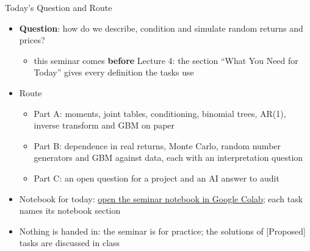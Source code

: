 \begin{frame}{Today's Question and Route}
\itemsize{\small}
\begin{itemize}
    \item \textbf{Question}: how do we describe, condition and simulate random returns and prices?
    \begin{itemize}
        \item this seminar comes \textbf{before} Lecture 4: the section ``What You Need for Today'' gives every definition the tasks use
    \end{itemize}
    \item Route
    \begin{itemize}
        \item Part A: moments, joint tables, conditioning, binomial trees, AR(1), inverse transform and GBM on paper
        \item Part B: dependence in real returns, Monte Carlo, random number generators and GBM against data, each with an interpretation question
        \item Part C: an open question for a project and an AI answer to audit
    \end{itemize}
    \item Notebook for today: \href{\nb}{open the seminar notebook in Google Colab}; each task names its notebook section
    \item Nothing is handed in: the seminar is for practice; the solutions of [Proposed] tasks are discussed in class
\end{itemize}
\end{frame}

